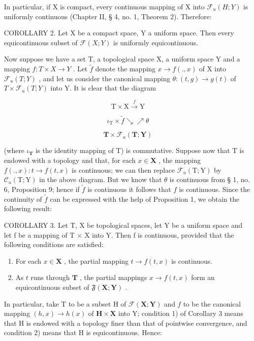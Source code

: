 In particular, if X is compact, every continuous mapping of X into \(\mathcal{F}_{u}(H;Y)\) is uniformly continuous (Chapter II, § 4, no. 1, Theorem 2). Therefore:

COROLLARY 2. Let X be a compact space, Y a uniform space. Then every equicontinuous subset of \(\mathcal{F}(X;Y)\) is uniformly equicontinuous.

Now suppose we have a set T, a topological space X, a uniform space Y and a mapping \(f: T \times X \to Y\) . Let \(\tilde{f}\) denote the mapping \(x \to f(., x)\) of X into \(\mathcal{F}_{u}(T; Y)\) , and let us consider the canonical mapping \(\theta: (t, g) \to g(t)\) of \(T \times \mathcal{F}_{u}(T; Y)\) into Y. It is clear that the diagram

\[
\mathrm{T} \times \mathrm{X} \xrightarrow {f} \mathrm{Y}
\]

\[
\iota_ {\mathrm{T}} \times \tilde {f} \searrow \nearrow \theta
\]

\[
\mathbf {T} \times \mathcal {F} _ {u} (\mathbf {T}; \mathbf {Y})
\]

(where \(\iota_{\mathbf{T}}\) is the identity mapping of T) is commutative. Suppose now that T is endowed with a topology and that, for each \(x \in \mathbf{X}\) , the mapping \(f(., x): t \to f(t, x)\) is continuous; we can then replace \(\mathcal{F}_{u}(\mathrm{T}; \mathrm{Y})\) by \(\mathcal{C}_{u}(\mathrm{T}; \mathrm{Y})\) in the above diagram. But we know that \(\theta\) is continuous from § 1, no. 6, Proposition 9; hence if \(\tilde{f}\) is continuous it follows that \(f\) is continuous. Since the continuity of \(\tilde{f}\) can be expressed with the help of Proposition 1, we obtain the following result:

COROLLARY 3. Let T, X be topological spaces, let Y be a uniform space and let f be a mapping of T × X into Y. Then f is continuous, provided that the following conditions are satisfied:

\begin{enumerate}
\def\labelenumi{\arabic{enumi})}
\item
  For each \(x \in \mathbf{X}\) , the partial mapping \(t \to f(t, x)\) is continuous.
\item
  As \(t\) runs through \(\mathbf{T}\) , the partial mappings \(x \to f(t, x)\) form an equicontinuous subset of \(\mathfrak{F}(\mathbf{X}; \mathbf{Y})\) .
\end{enumerate}

In particular, take T to be a subset H of \(\mathcal{F}(\mathbf{X};\mathbf{Y})\) and \(f\) to be the canonical mapping \((h,x)\to h(x)\) of \(\mathbf{H}\times \mathbf{X}\) into Y; condition 1) of Corollary 3 means that H is endowed with a topology finer than that of pointwise convergence, and condition 2) means that H is equicontinuous. Hence:

